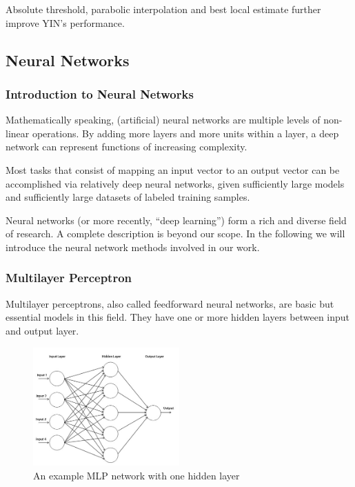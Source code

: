 \documentclass[11pt,a4paper,titlepage]{article}
\begin{document}
Absolute threshold, parabolic interpolation and best local estimate further improve YIN's performance.

\newpage

\subsection{Neural Networks}

\subsubsection{Introduction to Neural Networks}

Mathematically speaking, (artificial) neural networks are multiple levels of non-linear operations.
By adding more layers and more units within a layer, a deep network can represent functions of increasing complexity.

Most tasks that consist of mapping an input vector to an output vector can be accomplished via relatively deep neural networks, given sufficiently large models and sufficiently large datasets of labeled training samples.

Neural networks (or more recently, \enquote{deep learning}) form a rich and diverse field of research.
A complete description is beyond our scope.
In the following we will introduce the neural network methods involved in our work.

\subsubsection{Multilayer Perceptron}

Multilayer perceptrons, also called feedforward neural networks, are basic but essential models in this field.
They have one or more hidden layers between input and output layer.

\begin{figure}[htbp]
  \centering
  \includegraphics[width=0.5\textwidth]{mlp-example.jpg}
  \caption{An example MLP network with one hidden layer} \label{fig:mlp-example}
\end{figure}
\end{document}
